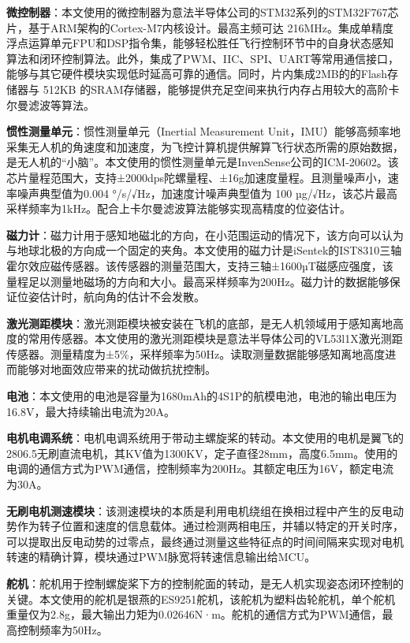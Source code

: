\textbf{微控制器}：本文使用的微控制器为意法半导体公司的STM32系列的STM32F767芯片，基于ARM架构的Cortex-M7内核设计。最高主频可达 216MHz。集成单精度浮点运算单元FPU和DSP指令集，能够轻松胜任飞行控制环节中的自身状态感知算法和闭环控制算法。此外，集成了PWM、IIC、SPI、UART等常用通信接口，能够与其它硬件模块实现低时延高可靠的通信。同时，片内集成2MB的的Flash存储器与 512KB 的SRAM存储器，能够提供充足空间来执行内存占用较大的高阶卡尔曼滤波等算法。

\textbf{惯性测量单元}：惯性测量单元（Inertial Measurement Unit，IMU）能够高频率地采集无人机的角速度和加速度，为飞控计算机提供解算飞行状态所需的原始数据，是无人机的“小脑”。本文使用的惯性测量单元是InvenSense公司的ICM-20602。该芯片量程范围大，支持±2000dps陀螺量程、±16g加速度量程。且测量噪声小，速率噪声典型值为0.004 °/s/√Hz，加速度计噪声典型值为 100 µg/√Hz，该芯片最高采样频率为1kHz。配合上卡尔曼滤波算法能够实现高精度的位姿估计。

\textbf{磁力计}：磁力计用于感知地磁北的方向，在小范围运动的情况下，该方向可以认为与地球北极的方向成一个固定的夹角。本文使用的磁力计是iSentek的IST8310三轴霍尔效应磁传感器。该传感器的测量范围大，支持三轴±1600µT磁感应强度，该量程足以测量地磁场的方向和大小。最高采样频率为200Hz。磁力计的数据能够保证位姿估计时，航向角的估计不会发散。

\textbf{激光测距模块}：激光测距模块被安装在飞机的底部，是无人机领域用于感知离地高度的常用传感器。本文使用的激光测距模块是意法半导体公司的VL53l1X激光测距传感器。测量精度为±5\%，采样频率为50Hz。读取测量数据能够感知离地高度进而能够对地面效应带来的扰动做抗扰控制。

\textbf{电池}：本文使用的电池是容量为1680mAh的4S1P的航模电池，电池的输出电压为16.8V，最大持续输出电流为20A。

\textbf{电机电调系统}：电机电调系统用于带动主螺旋桨的转动。本文使用的电机是翼飞的2806.5无刷直流电机，其KV值为1300KV，定子直径28mm，高度6.5mm。使用的电调的通信方式为PWM通信，控制频率为200Hz。其额定电压为16V，额定电流为30A。

\textbf{无刷电机测速模块}：该测速模块的本质是利用电机绕组在换相过程中产生的反电动势作为转子位置和速度的信息载体。通过检测两相电压，并辅以特定的开关时序，可以提取出反电动势的过零点，最终通过测量这些特征点的时间间隔来实现对电机转速的精确计算，模块通过PWM脉宽将转速信息输出给MCU。

\textbf{舵机}：舵机用于控制螺旋桨下方的控制舵面的转动，是无人机实现姿态闭环控制的关键。本文使用的舵机是银燕的ES9251舵机，该舵机为塑料齿轮舵机，单个舵机重量仅为2.8g，最大输出力矩为0.02646N·m。舵机的通信方式为PWM通信，最高控制频率为50Hz。

